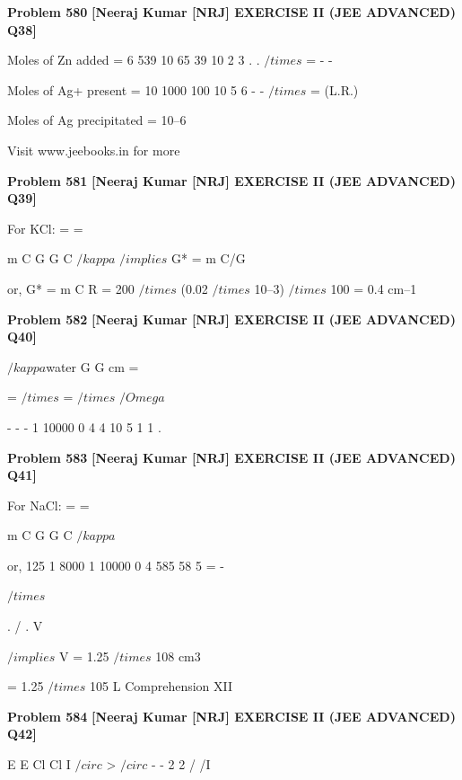 \begin{problembox}
\textbf{Problem 580} \hfill \textbf{[Neeraj Kumar [NRJ] EXERCISE II (JEE ADVANCED) Q38]}
\label{q:ext-nrj_all_questions-580}

Moles of Zn added = 6 539 10
65 39
10
2
3
.
.
$/times$
=
-
-
 
 Moles of Ag+ present = 10
1000
100
10
5
6
-
-
$/times$
=
(L.R.)
 
   Moles of Ag precipitated = 10--6
 
 
Visit www.jeebooks.in for more
\end{problembox}

\begin{problembox}
\textbf{Problem 581} \hfill \textbf{[Neeraj Kumar [NRJ] EXERCISE II (JEE ADVANCED) Q39]}
\label{q:ext-nrj_all_questions-581}

For KCl:  
=
=
 
 
m
C
G G
C
$/kappa$
 $/implies$ G* =  m   C/G
 
 or, G* =  m   C   R = 200 $/times$ (0.02 $/times$ 10--3) $/times$ 100 = 0.4 
cm--1
\end{problembox}

\begin{problembox}
\textbf{Problem 582} \hfill \textbf{[Neeraj Kumar [NRJ] EXERCISE II (JEE ADVANCED) Q40]}
\label{q:ext-nrj_all_questions-582}

$/kappa$water
G G
cm
=
 
=
$/times$
=
$/times$
$/Omega$
 
-
-
-
1
10000
0 4
4 10 5
1
1
.
\end{problembox}

\begin{problembox}
\textbf{Problem 583} \hfill \textbf{[Neeraj Kumar [NRJ] EXERCISE II (JEE ADVANCED) Q41]}
\label{q:ext-nrj_all_questions-583}

For NaCl:  
=
=
 
 
m
C
G G
C
$/kappa$
 
 
 or, 125
1
8000
1
10000
0 4
585 58 5
=
-
 
  
 
  $/times$
 
  
 
  
.
/
.
V
 
 
 $/implies$ V = 1.25 $/times$ 108 cm3
 
 = 1.25 $/times$ 105 L
Comprehension XII
\end{problembox}

\begin{problembox}
\textbf{Problem 584} \hfill \textbf{[Neeraj Kumar [NRJ] EXERCISE II (JEE ADVANCED) Q42]}
\label{q:ext-nrj_all_questions-584}

E
E
Cl
Cl
I
$/circ$
>
$/circ$
-
-
2
2
/
/I
\end{problembox}

